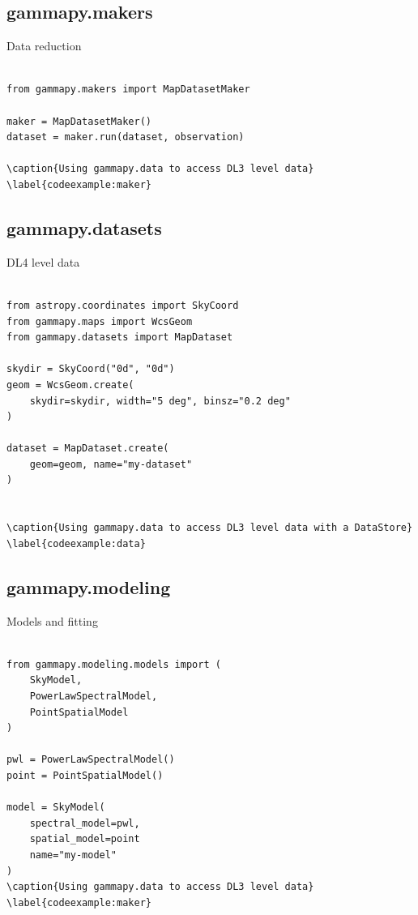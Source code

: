 \subsection{gammapy.makers}
Data reduction

\begin{lstlisting}

from gammapy.makers import MapDatasetMaker

maker = MapDatasetMaker()
dataset = maker.run(dataset, observation)

\caption{Using gammapy.data to access DL3 level data}
\label{codeexample:maker}
\end{lstlisting}


\subsection{gammapy.datasets}
DL4 level data


\begin{lstlisting}

from astropy.coordinates import SkyCoord
from gammapy.maps import WcsGeom
from gammapy.datasets import MapDataset

skydir = SkyCoord("0d", "0d")
geom = WcsGeom.create(
	skydir=skydir, width="5 deg", binsz="0.2 deg"
)

dataset = MapDataset.create(
	geom=geom, name="my-dataset"
)


\caption{Using gammapy.data to access DL3 level data with a DataStore}
\label{codeexample:data}
\end{lstlisting}



\subsection{gammapy.modeling}
Models and fitting

\begin{lstlisting}

from gammapy.modeling.models import (
	SkyModel,
	PowerLawSpectralModel,
	PointSpatialModel
)

pwl = PowerLawSpectralModel()
point = PointSpatialModel()

model = SkyModel(
	spectral_model=pwl,
	spatial_model=point
	name="my-model"
)
\caption{Using gammapy.data to access DL3 level data}
\label{codeexample:maker}
\end{lstlisting}


